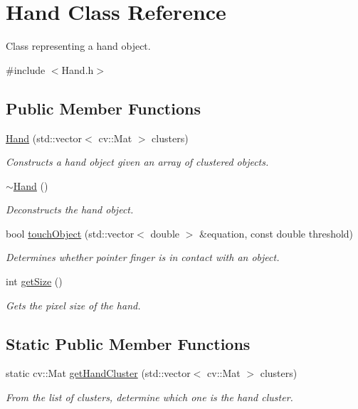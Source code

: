 \hypertarget{class_hand}{}\section{Hand Class Reference}
\label{class_hand}


Class representing a hand object.  




{\ttfamily \#include $<$Hand.\+h$>$}

\subsection*{Public Member Functions}
\begin{DoxyCompactItemize}
\item 
\hyperlink{class_hand_a77bc39dbcb8eee3927dd326b22bd3ae7}{Hand} (std\+::vector$<$ cv\+::\+Mat $>$ clusters)
\begin{DoxyCompactList}\small\item\em Constructs a hand object given an array of clustered objects. \end{DoxyCompactList}\item 
\hypertarget{class_hand_a7ff29a6f23f98c5e57f44d23a76912be}{}\label{class_hand_a7ff29a6f23f98c5e57f44d23a76912be} 
\hyperlink{class_hand_a7ff29a6f23f98c5e57f44d23a76912be}{$\sim$\+Hand} ()
\begin{DoxyCompactList}\small\item\em Deconstructs the hand object. \end{DoxyCompactList}\item 
bool \hyperlink{class_hand_aad89c3e47921cb0c39430f4501238088}{touch\+Object} (std\+::vector$<$ double $>$ \&equation, const double threshold)
\begin{DoxyCompactList}\small\item\em Determines whether pointer finger is in contact with an object. \end{DoxyCompactList}\item 
\hypertarget{class_hand_abd15e5110f6a2f0809e2064c808a829c}{}\label{class_hand_abd15e5110f6a2f0809e2064c808a829c} 
int \hyperlink{class_hand_abd15e5110f6a2f0809e2064c808a829c}{get\+Size} ()
\begin{DoxyCompactList}\small\item\em Gets the pixel size of the hand. \end{DoxyCompactList}\end{DoxyCompactItemize}
\subsection*{Static Public Member Functions}
\begin{DoxyCompactItemize}
\item 
static cv\+::\+Mat \hyperlink{class_hand_aa3ada30b516302dbabe5813f8eb6ac1a}{get\+Hand\+Cluster} (std\+::vector$<$ cv\+::\+Mat $>$ clusters)
\begin{DoxyCompactList}\small\item\em From the list of clusters, determine which one is the hand cluster. \end{DoxyCompactList}\end{DoxyCompactItemize}

